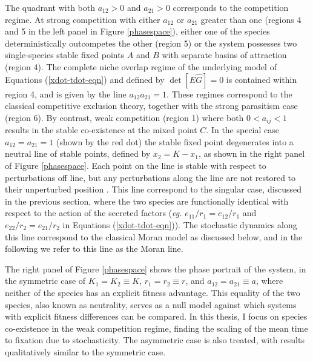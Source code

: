 The quadrant with both $a_{12}>0$ and $a_{21}>0$ corresponds to the competition regime. 
At strong competition with either $a_{12}$ or $a_{21}$ greater than one (regions 4 and 5 in the left panel in Figure \ref{phasespace}), either one of the species deterministically outcompetes the other (region 5) or the system possesses two single-species stable fixed points $A$ and $B$ with separate basins of attraction (region 4). 
The complete niche overlap regime of the underlying model of Equations (\ref{xdot-tdot-eqn}) and defined by $\det[\hat{E}\hat{G}]=0$ is contained within region 4, and is given by the line $a_{12}a_{21}=1$. 
These regimes correspond to the classical competitive exclusion theory, together with the strong parasitism case (region 6). %
By contrast, weak competition (region 1) where both $0<a_{ij}<1$ results in the stable co-existence at the mixed point $C$. 
In the special case $a_{12}=a_{21}=1$ (shown by the red dot) the stable fixed point degenerates into a neutral line of stable points, defined by $x_2 = K - x_1$, as shown in the right panel of Figure \ref{phasespace}. 
Each point on the line is stable with respect to perturbations off line, but any perturbations along the line are not restored to their unperturbed position \cite{McGehee1977a,Case1979}. 
This line correspond to the singular case, discussed in the previous section, where the two species are functionally identical with respect to the action of the secreted factors (\emph{eg.} $e_{11}/r_1=e_{12}/r_1$ and $e_{22}/r_2=e_{21}/r_2$ in Equations (\ref{xdot-tdot-eqn})). 
The stochastic dynamics along this line correspond to the classical Moran model as discussed below, and in the following we refer to this line as the Moran line.

The right panel of Figure \ref{phasespace} shows the phase portrait of the system, in the symmetric case of $ K_1 = K_2\equiv K$, $r_1 = r_2\equiv r$, and $a_{12}=a_{21}\equiv a$, where neither of the species has an explicit fitness advantage. 
This equality of the two species, also known as neutrality, serves as a null model against which systems with explicit fitness differences can be compared. 
In this thesis, I focus on species co-existence in the weak competition regime, finding the scaling of the mean time to fixation due to stochasticity. %
The asymmetric case is also treated, with results qualitatively similar to the symmetric case. 


